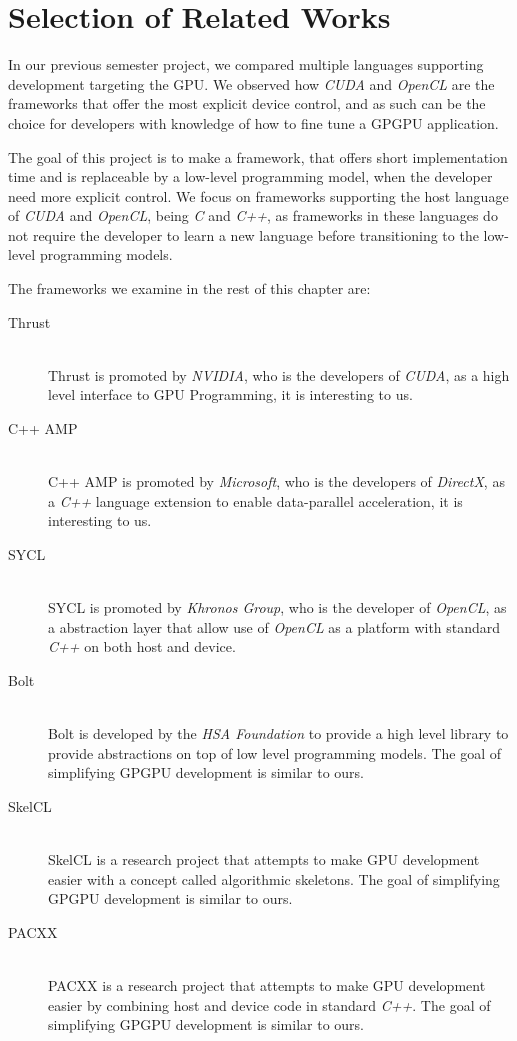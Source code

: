 
\section{Selection of Related Works}
In our previous semester project\cite{sw9Report}, we compared multiple languages supporting development targeting the GPU. We observed how \textit{CUDA} and \textit{OpenCL} are the frameworks that offer the most explicit device control, and as such can be the choice for developers with knowledge of how to fine tune a GPGPU application. 

The goal of this project is to make a framework, that offers short implementation time and is replaceable by a low-level programming model, when the developer need more explicit control. We focus on frameworks supporting the host language of \textit{CUDA} and \textit{OpenCL}, being \textit{C} and \textit{C++}, as frameworks in these languages do not require the developer to learn a new language before transitioning to the low-level programming models. 

The frameworks we examine in the rest of this chapter are:
\begin{description}
\item[Thrust] \hfill \\
Thrust is promoted by \textit{NVIDIA}, who is the developers of \textit{CUDA}, as a high level interface to GPU Programming, it is interesting to us\cite{thrustNvidia}.
\item[C++ AMP] \hfill \\
C++ AMP is promoted by \textit{Microsoft}, who is the developers of \textit{DirectX}, as a \textit{C++} language extension to enable data-parallel acceleration, it is interesting to us\cite{microsoftCppAMP}.
\item[SYCL] \hfill \\
SYCL is promoted by \textit{Khronos Group}, who is the developer of \textit{OpenCL}, as a abstraction layer that allow use of \textit{OpenCL} as a platform with standard \textit{C++} on both host and device\cite{khronosSYCL}.
\item[Bolt] \hfill \\
Bolt is developed by the \textit{HSA Foundation} to provide a high level library to provide abstractions on top of low level programming models. The goal of simplifying GPGPU development is similar to ours\cite{boltDoc}.
\item[SkelCL] \hfill \\
SkelCL is a research project that attempts to make GPU development easier with a concept called algorithmic skeletons. The goal of simplifying GPGPU development is similar to ours\cite{skelclPaper}.
\item[PACXX] \hfill \\
PACXX is a research project that attempts to make GPU development easier by combining host and device code in standard \textit{C++}. The goal of simplifying GPGPU development is similar to ours\cite{pacxxPaper}.
\end{description}


